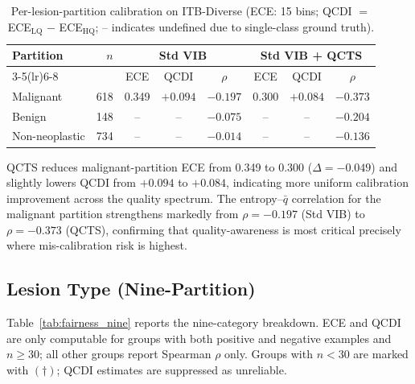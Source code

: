 \documentclass{bmvc2k}
\newcommand{\qbar}{\bar{q}}
\begin{document}
\begin{table}[h]
\centering
\caption{Per-lesion-partition calibration on ITB-Diverse (ECE: 15 bins;
  QCDI $=$ ECE$_\text{LQ}$ $-$ ECE$_\text{HQ}$; -- indicates undefined due
  to single-class ground truth).}
\label{tab:fairness_three}
\footnotesize
\begin{tabular}{lrcccccc}
\toprule
Partition & $n$ & \multicolumn{3}{c}{Std VIB} & \multicolumn{3}{c}{Std VIB + QCTS} \\
\cmidrule(lr){3-5}\cmidrule(lr){6-8}
& & ECE & QCDI & $\rho$ & ECE & QCDI & $\rho$ \\
\midrule
Malignant      & 618 & 0.349 & $+0.094$ & $-0.197$ & 0.300 & $+0.084$ & $-0.373$ \\
Benign         & 148 &  --   &    --    & $-0.075$ &  --   &    --    & $-0.204$ \\
Non-neoplastic & 734 &  --   &    --    & $-0.014$ &  --   &    --    & $-0.136$ \\
\bottomrule
\end{tabular}
\end{table}

QCTS reduces malignant-partition ECE from 0.349 to 0.300 ($\Delta{=}{-}0.049$)
and slightly lowers QCDI from $+0.094$ to $+0.084$, indicating more
uniform calibration improvement across the quality spectrum. The
entropy--$\qbar$ correlation for the malignant partition strengthens markedly
from $\rho{=}{-}0.197$ (Std VIB) to $\rho{=}{-}0.373$ (QCTS), confirming
that quality-awareness is most critical precisely where mis-calibration risk
is highest.

\subsection{Lesion Type (Nine-Partition)}
\label{app:fairness_nine}

Table~\ref{tab:fairness_nine} reports the nine-category breakdown.
ECE and QCDI are only computable for groups with both positive and negative
examples and $n{\ge}30$; all other groups report Spearman $\rho$ only.
Groups with $n{<}30$ are marked with $(\dagger)$; QCDI estimates are
suppressed as unreliable.
\end{document}
